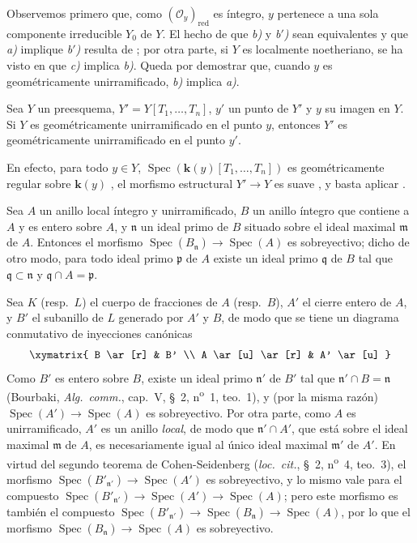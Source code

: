 Observemos primero que, como $(\mathcal O_y)_{\mathrm{red}}$ es íntegro, $y$ pertenece a una sola componente irreducible $Y_0$ de $Y$.
El hecho de que \emph{b)} y \emph{b$'$)} sean equivalentes y que \emph{a)} implique \emph{b$'$)} resulta de ; por otra parte, si $Y$ es localmente noetheriano, se ha visto en  que \emph{c)} implica \emph{b)}.
Queda por demostrar que, cuando $y$ es geométricamente unirramificado, \emph{b)} implica \emph{a)}.

\begin{lemma}[14.4.1.1]
\label{IV.14.4.1.1}
Sea $Y$ un preesquema, $Y'=Y[T_1,\ldots,T_n]$, $y'$ un punto de $Y'$ y $y$ su imagen en $Y$.
Si $Y$ es geométricamente unirramificado en el punto $y$, entonces $Y'$ es geométricamente unirramificado en el punto $y'$.
\end{lemma}

En efecto, para todo $y\in Y$, $\operatorname{Spec}(\boldsymbol{k}(y)[T_1,\ldots,T_n])$ es geométricamente regular sobre $\boldsymbol{k}(y)$ , el morfismo estructural $Y'\to Y$ es suave , y basta aplicar .

\begin{lemma}[14.4.1.2]
\label{IV.14.4.1.2}
Sea $A$ un anillo local íntegro y \textup{unirramificado}, $B$ un anillo íntegro que contiene a $A$ y es entero sobre $A$, y $\mathfrak n$ un ideal primo de $B$ situado sobre el ideal maximal $\mathfrak m$ de $A$.
Entonces el morfismo $\operatorname{Spec}(B_{\mathfrak n})\to\operatorname{Spec}(A)$ es sobreyectivo; dicho de otro modo, para todo ideal primo $\mathfrak p$ de $A$ existe un ideal primo $\mathfrak q$ de $B$ tal que $\mathfrak q\subset\mathfrak n$ y $\mathfrak q\cap A=\mathfrak p$.
\end{lemma}

Sea $K$ (resp.\ $L$) el cuerpo de fracciones de $A$ (resp.\ $B$), $A'$ el cierre entero de $A$, y $B'$ el subanillo de $L$ generado por $A'$ y $B$, de modo que se tiene un diagrama conmutativo de inyecciones canónicas
\[
  \xymatrix{
    B \ar[r] & B' \\
    A \ar[u] \ar[r] & A' \ar[u]
  }
\]
Como $B'$ es entero sobre $B$, existe un ideal primo $\mathfrak n'$ de $B'$ tal que $\mathfrak n'\cap B=\mathfrak n$ (Bourbaki, \emph{Alg.\ comm.}, cap.~V, \S~2, n\textsuperscript{o}~1, teo.~1), y (por la misma razón) $\operatorname{Spec}(A')\to\operatorname{Spec}(A)$ es sobreyectivo.
Por otra parte, como $A$ es unirramificado, $A'$ es un anillo \emph{local}, de modo que $\mathfrak n'\cap A'$, que está sobre el ideal maximal $\mathfrak m$ de $A$, es necesariamente igual al único ideal maximal $\mathfrak m'$ de $A'$.
En virtud del segundo teorema de Cohen-Seidenberg (\emph{loc.\ cit.}, \S~2, n\textsuperscript{o}~4, teo.~3), el morfismo $\operatorname{Spec}(B'_{\mathfrak n'})\to\operatorname{Spec}(A')$ es sobreyectivo, y lo mismo vale para el compuesto $\operatorname{Spec}(B'_{\mathfrak n'})\to\operatorname{Spec}(A')\to
\operatorname{Spec}(A)$; pero este morfismo es también el compuesto $\operatorname{Spec}(B'_{\mathfrak n'})\to\operatorname{Spec}(B_{\mathfrak n})
\to\operatorname{Spec}(A)$, por lo que el morfismo $\operatorname{Spec}(B_{\mathfrak n})\to\operatorname{Spec}(A)$ es sobreyectivo.

